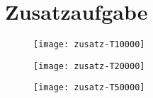 \section{Zusatzaufgabe}
\begin{figure}[ht]
\begin{center}
\texttt{[image: zusatz-T10000]}
\end{center}
\end{figure}


\begin{figure}[ht]
\begin{center}
\texttt{[image: zusatz-T20000]}
\end{center}
\end{figure}

\begin{figure}[ht]
\begin{center}
\texttt{[image: zusatz-T50000]}
\end{center}
\end{figure}

